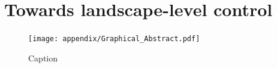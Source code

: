 \section{Towards landscape-level control}

\blindtext

\blindtext

\begin{figure}
    \centering
    \texttt{[image: appendix/Graphical\_Abstract.pdf]}
    \caption{Caption}
    \label{fig:my_label}
\end{figure}




